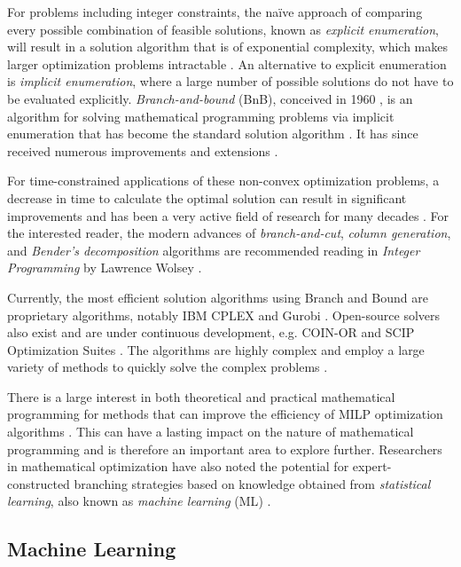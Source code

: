 For problems including integer constraints, the na\"ive approach of comparing every possible combination of feasible solutions, known as \textit{explicit enumeration}, will result in a solution algorithm that is of exponential complexity, which makes larger optimization problems intractable \cite{wolsey2020integer}. An alternative to explicit enumeration is \textit{implicit enumeration}, where a large number of possible solutions do not have to be evaluated explicitly. 
\textit{Branch-and-bound} (\gls{BnB}), conceived in 1960 \cite{land1960automatic}, is an algorithm for solving mathematical programming problems via implicit enumeration that has become the standard solution algorithm \cite{wolsey2020integer}. It has since received numerous improvements and extensions \cite{wolsey2020integer}. 

For time-constrained applications of these non-convex optimization problems, a decrease in time to calculate the optimal solution can result in significant improvements and has been a very active field of research for many decades \cite{wolsey2020integer}. For the interested reader, the modern advances of \textit{branch-and-cut}, \textit{column generation}, and \textit{Bender's decomposition} algorithms are recommended reading in \textit{Integer Programming} by Lawrence Wolsey \cite{wolsey2020integer}.

Currently, the most efficient solution algorithms using Branch and Bound are proprietary algorithms, notably IBM CPLEX and Gurobi \cite{anand2017comparative}. Open-source solvers also exist and are under continuous development, e.g. \gls{COIN-OR} and \gls{SCIP} Optimization Suites \cite{achterberg2009scip,anand2017comparative}. The algorithms are highly complex and employ a large variety of methods to quickly solve the complex problems \cite{wolsey2020integer}. 

There is a large interest in both theoretical and practical mathematical programming for methods that can improve the efficiency of \gls{MILP} optimization algorithms \cite{wolsey2020integer}. This can have a lasting impact on the nature of mathematical programming and is therefore an important area to explore further. Researchers in mathematical optimization have also noted the potential for expert-constructed branching strategies based on knowledge obtained from \textit{statistical learning}, also known as \textit{machine learning} (\Gls{ML}) \cite{lodi2017learning}.




\subsection{Machine Learning}

